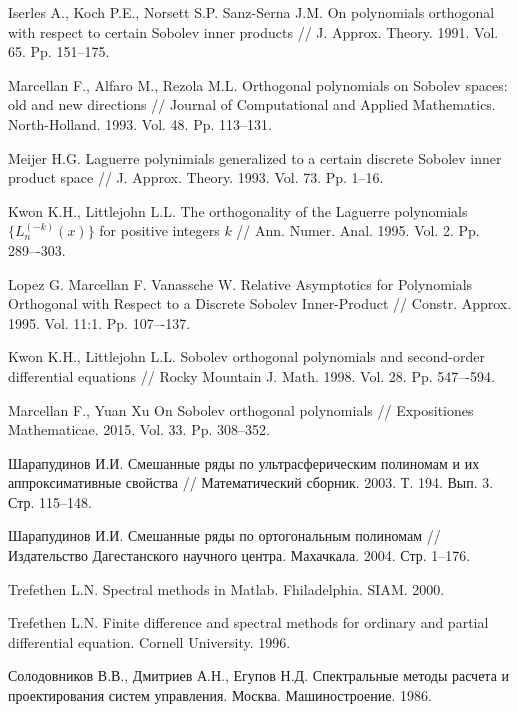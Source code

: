 \begin{thebibliography}{1}
{Iserles A., Koch P.E., Norsett S.P. Sanz-Serna J.M.}
On polynomials  orthogonal  with respect  to certain Sobolev inner products // J. Approx. Theory. 1991. Vol. 65. Pp. 151--175.

{Marcellan F., Alfaro M., Rezola M.L.}
Orthogonal polynomials on Sobolev spaces: old and new directions // Journal of Computational and Applied Mathematics. North-Holland. 1993. Vol. 48. Pp. 113--131.

{Meijer H.G.}
Laguerre polynimials generalized to a certain discrete Sobolev inner product space // J. Approx. Theory. 1993. Vol. 73. Pp. 1--16.

{Kwon K.H., Littlejohn L.L.}
The orthogonality of the Laguerre polynomials $\{L_n^{(-k)}(x)\}$ for positive integers $k$ // Ann. Numer. Anal. 1995. Vol. 2. Pp. 289–-303.

{Lopez G. Marcellan F. Vanassche W.}
Relative Asymptotics for Polynomials Orthogonal with Respect to a Discrete Sobolev Inner-Product // Constr. Approx. 1995. Vol. 11:1. Pp. 107–-137.

{Kwon K.H., Littlejohn L.L.}
Sobolev orthogonal polynomials and second-order differential equations // Rocky Mountain J. Math. 1998. Vol. 28. Pp. 547–-594.

{Marcellan F., Yuan Xu}
On Sobolev orthogonal polynomials // Expositiones Mathematicae. 2015. Vol. 33. Pp. 308--352.

{Шарапудинов И.И.}
Смешанные ряды по ультрасферическим полиномам и их аппроксимативные свойства // Математический сборник. 2003. Т. 194. Вып. 3. Стр. 115--148.

{Шарапудинов И.И.}
Смешанные ряды по ортогональным полиномам // Издательство Дагестанского научного центра. Махачкала. 2004. Стр. 1--176.

{Trefethen  L.N.}
Spectral methods in Matlab. Fhiladelphia. SIAM. 2000.

{Trefethen L.N.}
Finite difference and spectral methods for ordinary and partial differential equation. Cornell University. 1996.

{Солодовников В.В., Дмитриев А.Н., Егупов Н.Д.}
Спектральные методы расчета и проектирования систем управления. Москва. Машиностроение. 1986.


\end{thebibliography}
